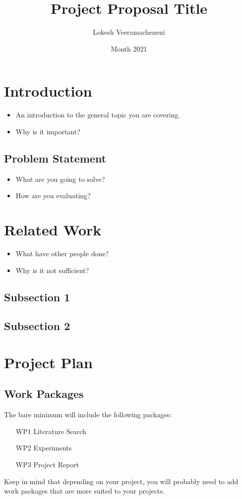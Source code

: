 \documentclass[thesis]{mas_proposal}
\title{Project Proposal Title}
\author{Lokesh Veeramacheneni}
\date{Month 2021}
\begin{document}
\maketitle

\pagestyle{plain}

\section{Introduction}
\begin{itemize}
    \item An introduction to the general topic you are covering.
    \item Why is it important?
\end{itemize}

\subsection{Problem Statement}
\begin{itemize}
    \item What are you going to solve?
    \item How are you evaluating?
\end{itemize}


\section{Related Work}
\begin{itemize}
    \item What have other people done?
    \item Why is it not sufficient?
\end{itemize}

\subsection{Subsection 1}
\subsection{Subsection 2}



\section{Project Plan}

\subsection{Work Packages}
The bare minimum will include the following packages:
\begin{enumerate}
    \item[WP1] Literature Search
    \item[WP2] Experiments
    \item[WP3] Project Report
\end{enumerate}
Keep in mind that depending on your project, you will probably need to add work packages that are more suited to your projects.
\end{document}
